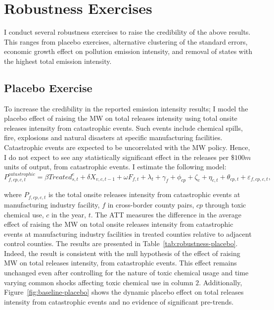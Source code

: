 \documentclass[12pt, english]{article}
\begin{document}
%    
%    
%    


    \section{Robustness Exercises}\label{sec:robustness-exercises}
    I conduct several robustness exercises to raise the credibility of the above results. This ranges from placebo exercises, alternative clustering of the standard errors, economic growth effect on pollution emission intensity, and removal of states with the highest total emission intensity.

    \subsection{Placebo Exercise}\label{subsec:placebo-exercise}
    To increase the credibility in the reported emission intensity results; I model the placebo effect of raising the MW on total releases intensity using total onsite releases intensity from catastrophic events. Such events include chemical spills, fire, explosions and natural disasters at specific manufacturing facilities. Catastrophic events are expected to be uncorrelated with the MW policy. Hence, I do not expect to see any statistically significant effect in the releases per $\$100m$ units of output, from catastrophic events. I estimate the following model:
    \begin{equation}
        P_{f,cp,c,t}^{catastrophic} = \beta Treated_{s,t}^e + \delta X_{v,c,t-1} + \omega F_{f,t} + \lambda_{t} + \gamma_{f} + \phi_{cp} + \zeta_{c} + \eta_{c,t} + \theta_{cp,t} + \varepsilon_{f,cp,c,t},\label{eq:robustness-placebo}
    \end{equation}
    

    where $P_{f,cp,c,t}$ is the total onsite releases intensity from catastrophic events at manufacturing industry facility, $f$ in cross-border county pairs, $cp$ through toxic chemical use, $c$ in the year, $t$. The ATT measures the difference in the average effect of raising the MW on total onsite releases intensity from catastrophic events at manufacturing industry facilities in treated counties relative to adjacent control counties. The results are presented in Table~\ref{tab:robustness-placebo}. Indeed, the result is consistent with the null hypothesis of the effect of raising MW on total releases intensity, from catastrophic events. This effect remains unchanged even after controlling for the nature of toxic chemical usage and time varying common shocks affecting toxic chemical use in column $2$. Additionally, Figure~\ref{fig:baseline-placebo} shows the dynamic placebo effect on total releases intensity from catastrophic events and no evidence of significant pre-trends.
    
\end{document}
